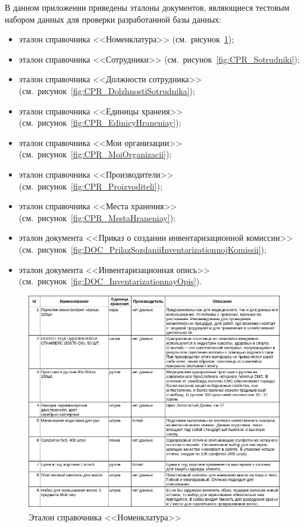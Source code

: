 \thispagestyle{plain}
\pagestyle{plain}
\hspace{0pt}

В данном приложении приведены эталоны документов,
являющиеся тестовым набором данных для проверки разработанной базы данных:

\begin{itemize}
    \item эталон справочника <<Номенклатура>> (см.~рисунок~\ref{fig:CPR_Nomenklatura});
    \item эталон справочника <<Сотрудники>> (см.~рисунок~\ref{fig:CPR_Sotrudniki});
    \item эталон справочника <<Должности сотрудника>> (см.~рисунок~\ref{fig:CPR_DolzhnostiSotrudnika});
    \item эталон справочника <<Единицы хранеия>> (см.~рисунок~\ref{fig:CPR_EdinicyHraneniay});
    \item эталон справочника <<Мои организации>> (см.~рисунок~\ref{fig:CPR_MoiOrganizacii});
    \item эталон справочника <<Производители>> (см.~рисунок~\ref{fig:CPR_Proizvoditeli});
    \item эталон справочника <<Места хранения>> (см.~рисунок~\ref{fig:CPR_MestaHraneniay});
    \item эталон документа <<Приказ о создании инвентаризационной комиссии>> (см.~рисунок~\ref{fig:DOC_PrilazSozdaniiInventarizationnojKomissii});
    \item эталон документа <<Инвентаризационная опись>> (см.~рисунок~\ref{fig:DOC_InventarizationnayOpis}).
\end{itemize}

\begin{figure}[!h]
    \centering

    \includegraphics[width=17cm]
    {assets/etalons/CPR_Nomenklatura.jpg}

    \caption{Эталон справочника <<Номенклатура>>}

    \label{fig:CPR_Nomenklatura}
\end{figure}

